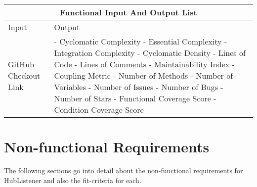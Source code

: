 \documentclass{article}
\begin{document}
\begin{tabular}{ |p{6cm}||p{6cm}| }
\hline
\multicolumn{2}{|c|}{Functional Input And Output List} \\
\hline
Input & Output \\
\hline 
GitHub Checkout Link & 
- Cyclomatic Complexity \newline
- Essential Complexity \newline
- Integration Complexity \newline
- Cyclomatic Density\newline
- Lines of Code \newline
- Lines of Comments\newline
- Maintainability Index\newline
- Coupling Metric \newline
- Number of Methods\newline
- Number of Variables\newline 
- Number of Issues\newline
- Number of Bugs\newline
- Number of Stars\newline
- Functional Coverage Score\newline
- Condition Coverage Score \\
\hline
\end{tabular}


\newpage
\section{Non-functional Requirements}

The following sections go into detail about the non-functional requirements for HubListener and also the fit-criteria for each. \newline
\end{document}
